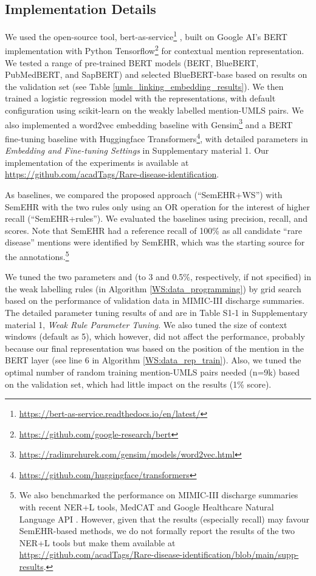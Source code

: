 \documentclass[twocolumn]{bmcart}
\begin{document}
\subsection*{Implementation Details}
We used the open-source tool, bert-as-service\footnote{\url{https://bert-as-service.readthedocs.io/en/latest/}} \cite{xiao2019bertservice}, built on Google AI's BERT implementation with Python Tensorflow\footnote{\url{https://github.com/google-research/bert}} \cite{devlin-etal-2019-bert} for contextual mention representation. We tested a range of pre-trained BERT models (BERT, BlueBERT, PubMedBERT, and SapBERT) and selected BlueBERT-base \cite{peng2019transfer} based on results on the validation set (see Table \ref{umls_linking_embedding_results}). We then trained a logistic regression model with the representations, with default configuration using scikit-learn \cite{scikit-learn} on the weakly labelled mention-UMLS pairs. We also implemented a word2vec embedding baseline with Gensim\footnote{\url{https://radimrehurek.com/gensim/models/word2vec.html}} and a BERT fine-tuning baseline with Huggingface Transformers\footnote{\url{https://github.com/huggingface/transformers}}, with detailed parameters in \textit{Embedding and Fine-tuning Settings} in Supplementary material 1. Our implementation of the experiments is available at \url{https://github.com/acadTags/Rare-disease-identification}.

As baselines, we compared the proposed approach (``SemEHR+WS'') with SemEHR with the two rules only using an OR operation for the interest of higher recall (``SemEHR+rules''). We evaluated the baselines using precision, recall, and  scores. Note that SemEHR had a reference recall of 100\% as all candidate ``rare disease'' mentions were identified by SemEHR, which was the starting source for the annotations.\footnote{We also benchmarked the performance on MIMIC-III discharge summaries with recent NER+L tools, MedCAT \cite{Kraljevic2021} and Google Healthcare Natural Language API \cite{Bodnari2020}. However, given that the results (especially recall) may favour SemEHR-based methods, we do not formally report the results of the two NER+L tools but make them available at \url{https://github.com/acadTags/Rare-disease-identification/blob/main/supp-results}.}

We tuned the two parameters  and  (to 3 and 0.5\%, respectively, if not specified) in the weak labelling rules (in Algorithm \ref{WS:data_programming}) by grid search based on the performance of validation data in MIMIC-III discharge summaries. The detailed parameter tuning results of  and  are in Table S1-1 in Supplementary material 1, \textit{Weak Rule Parameter Tuning}. We also tuned the size of context windows (default as 5), which however, did not affect the performance, probably because our final representation was based on the position of the mention in the BERT layer (see line 6 in Algorithm \ref{WS:data_rep_train}). Also, we tuned the optimal number of random training mention-UMLS pairs needed (n=9k) based on the validation set, which had little impact on the results (1\%  score).
\end{document}
